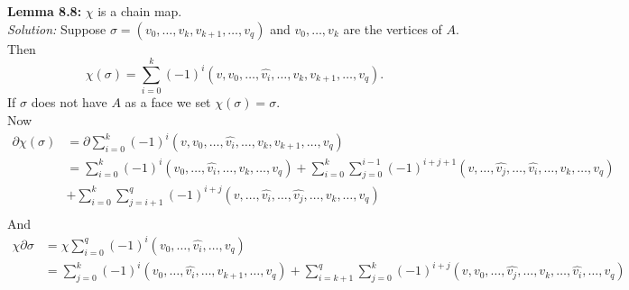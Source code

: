 \documentclass[a4paper]{article}
\begin{document}
\textbf{Lemma 8.8:} $\chi$ is a chain map.\\
\linebreak
\textit{Solution:} Suppose $\sigma = \left( v_0, \ldots, v_k, v_{k+1}, \ldots
,v_q \right) $ and $v_0, \ldots, v_k$ are the vertices of $A$. Then
\[
\chi \left( \sigma \right) 
= \sum_{i=0}^{k} (-1)^{i} \left( v, v_0, \ldots,
 \hat{v_i}, \ldots, v_k, v_{k+1}, \ldots, v_q \right).
\] 
If $\sigma$ does not have $A$ as a face we set 
$\chi (\sigma) = \sigma$.\\
Now
\begin{align*}
    \partial \chi (\sigma)
    &= \partial \sum_{i=0}^{k} (-1)^{i}
    \left( v, v_0, \ldots, \hat{v_i}, \ldots, v_k, v_{k+1}, \ldots, v_q
    \right)\\
    &= \sum_{i=0}^{k} (-1)^{i} \left( v_0, \ldots, \hat{v_i},\ldots,
    v_k, \ldots, v_q\right) 
    + \sum_{i=0}^{k} \sum_{j=0}^{i-1} (-1)^{i +j +1} \left( v,
    \ldots, \hat{v_j}, \ldots, \hat{v_i}, \ldots, v_k, \ldots, v_q\right)\\
    &+ \sum_{i=0}^{k} \sum_{j=i+1}^{q} (-1)^{i+j}
    (v, \ldots, \hat{v_i}, \ldots, \hat{v_j}, \ldots, v_k,\ldots, v_q)\\
\end{align*}
And
\begin{align*}
\chi \partial \sigma
&= \chi \sum_{i=0}^{q} (-1)^{i} \left( 
v_0, \ldots, \hat{v_i}, \ldots, v_q \right)\\
&= \sum_{j=0}^{k} (-1)^{i} \left( 
v_0 ,\ldots, \hat{v_i} , \ldots, v_{k+1}, \ldots, v_q \right)
+ \sum_{i=k+1}^{q} \sum_{j=0}^{k} (-1)^{i+j}
\left( v, v_0, \ldots, \hat{v_j},\ldots, v_k, \ldots, \hat{v_i},\ldots, v_q \right) 
\end{align*}
\end{document}
